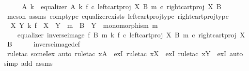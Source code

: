 \begin{isabellebody}
%
\isadelimproof
%
\endisadelimproof
%
\isatagproof
{}\isamarkupfalse%
\ {\isacharminus}{\kern0pt}\isanewline
\ \ \isamarkupfalse%
\ A\ k\ \ {\isachardoublequoteopen}equalizer\ A\ k\ {\isacharparenleft}{\kern0pt}f\ {\isasymcirc}\isactrlsub c\ left{\isacharunderscore}{\kern0pt}cart{\isacharunderscore}{\kern0pt}proj\ X\ B{\isacharparenright}{\kern0pt}\ {\isacharparenleft}{\kern0pt}m\ {\isasymcirc}\isactrlsub c\ right{\isacharunderscore}{\kern0pt}cart{\isacharunderscore}{\kern0pt}proj\ X\ B{\isacharparenright}{\kern0pt}{\isachardoublequoteclose}\isanewline
\ \ \ \ \isamarkupfalse%
\ {\isacharparenleft}{\kern0pt}meson\ assms{\isacharparenleft}{\kern0pt}{}{\isacharcomma}{\kern0pt}{}{\isacharparenright}{\kern0pt}\ comp{\isacharunderscore}{\kern0pt}type\ equalizer{\isacharunderscore}{\kern0pt}exists\ left{\isacharunderscore}{\kern0pt}cart{\isacharunderscore}{\kern0pt}proj{\isacharunderscore}{\kern0pt}type\ right{\isacharunderscore}{\kern0pt}cart{\isacharunderscore}{\kern0pt}proj{\isacharunderscore}{\kern0pt}type{\isacharparenright}{\kern0pt}\isanewline
\ \ \isamarkupfalse%
\ \isamarkupfalse%
\ {\isachardoublequoteopen}{\isasymexists}\ X\ Y\ k{\isachardot}{\kern0pt}\ f\ {\isacharcolon}{\kern0pt}\ X\ {\isasymrightarrow}\ Y\ {\isasymand}\ m\ {\isacharcolon}{\kern0pt}\ B\ {\isasymrightarrow}\ Y\ {\isasymand}\ monomorphism\ m\ {\isasymand}\isanewline
\ \ \ \ equalizer\ {\isacharparenleft}{\kern0pt}inverse{\isacharunderscore}{\kern0pt}image\ f\ B\ m{\isacharparenright}{\kern0pt}\ k\ {\isacharparenleft}{\kern0pt}f\ {\isasymcirc}\isactrlsub c\ left{\isacharunderscore}{\kern0pt}cart{\isacharunderscore}{\kern0pt}proj\ X\ B{\isacharparenright}{\kern0pt}\ {\isacharparenleft}{\kern0pt}m\ {\isasymcirc}\isactrlsub c\ right{\isacharunderscore}{\kern0pt}cart{\isacharunderscore}{\kern0pt}proj\ X\ B{\isacharparenright}{\kern0pt}{\isachardoublequoteclose}\isanewline
\ \ \ \ \isamarkupfalse%
\ inverse{\isacharunderscore}{\kern0pt}image{\isacharunderscore}{\kern0pt}def\ \isamarkupfalse%
\ {\isacharparenleft}{\kern0pt}rule{\isacharunderscore}{\kern0pt}tac\ someI{\isacharunderscore}{\kern0pt}ex{\isacharcomma}{\kern0pt}\ auto{\isacharcomma}{\kern0pt}\ rule{\isacharunderscore}{\kern0pt}tac\ x{\isacharequal}{\kern0pt}{\isachardoublequoteopen}A{\isachardoublequoteclose}\ \ exI{\isacharcomma}{\kern0pt}\ rule{\isacharunderscore}{\kern0pt}tac\ x{\isacharequal}{\kern0pt}{\isachardoublequoteopen}X{\isachardoublequoteclose}\ \ exI{\isacharcomma}{\kern0pt}\ rule{\isacharunderscore}{\kern0pt}tac\ x{\isacharequal}{\kern0pt}{\isachardoublequoteopen}Y{\isachardoublequoteclose}\ \ exI{\isacharcomma}{\kern0pt}\ auto\ simp\ add{\isacharcolon}{\kern0pt}\ assms{\isacharparenright}{\kern0pt}\isanewline

\end{isabellebody}
